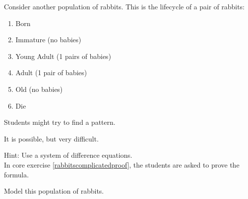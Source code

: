 	


\bookonlynewpage


\question
	Consider another population of rabbits. This is the lifecycle of a pair of rabbits:
	\begin{enumerate}[start=0,label=(year \arabic*)]
		\item Born
		\item Immature (no babies)
		\item Young Adult (1 pairs of babies)
		\item Adult (1 pair of babies)
		\item Old (no babies)
		\item Die
	\end{enumerate}	
\begin{annotation}
	\begin{goals}
		Students might try to find a pattern. 
		
		It is possible, but very difficult.
		
		Hint: Use a system of difference equations. \\
		
		In core exercise \ref{rabbitscomplicatedproof}, the students are asked to prove the formula.
	\end{goals}
\end{annotation}
	
	Model this population of rabbits.
	
	




\standardonlynewpage
%
%
%
%
%
%
%
%	
%	
%
%
%
%
%	
%
%
%
%
%
%
%
%
%





